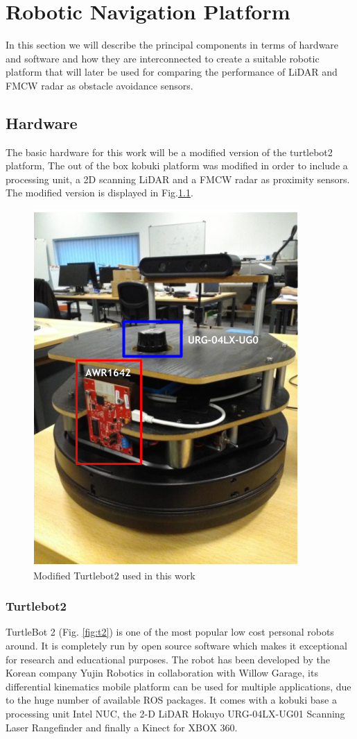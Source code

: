 \chapter{Robotic Navigation Platform }

In this section we will describe the principal components in terms of hardware and software and how they are interconnected to create a suitable robotic platform that will later be used for comparing the performance of \ac{LiDAR} and \ac{FMCW} \ac{radar} as obstacle avoidance sensors.


\section{Hardware}
The basic hardware for this work will be a  modified version of the  turtlebot2 platform,
The out of the box kobuki platform was modified in order to include a processing unit, a 2D scanning \ac{LiDAR} and a \ac{FMCW} radar as proximity sensors. The modified version is displayed in Fig.\ref{fig::turlebot2M}. 

\begin{figure}[ht!] 
\centerline{\includegraphics [width=0.4 \textwidth]{imgs/chapter4/turtlebot2.PNG}}
\caption{Modified Turtlebot2 used in this work}
\label{fig::turlebot2M}
\end{figure}

\subsection{Turtlebot2}
TurtleBot 2 (Fig. \ref{fig:t2}) is one of the  most popular low cost personal robots around. It is completely run by open source software which makes it exceptional for research and educational purposes. The robot has been developed by the Korean company Yujin Robotics in collaboration with Willow Garage, its differential kinematics mobile platform can be used for multiple applications, due to the huge number of available ROS packages. It comes with a kobuki base a processing unit Intel NUC, the 2-D \ac{LiDAR} Hokuyo URG-04LX-UG01 Scanning Laser Rangefinder and finally a Kinect for XBOX 360.

